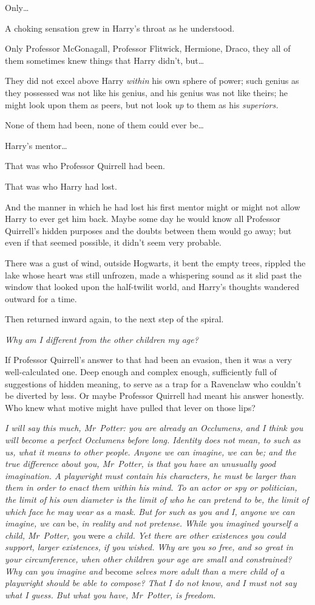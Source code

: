 Only…

A choking sensation grew in Harry's throat as he understood.

Only Professor McGonagall, Professor Flitwick, Hermione, Draco, they all of
them sometimes knew things that Harry didn't, but…

They did not excel above Harry \emph{within} his own sphere of power; such
genius as they possessed was not like his genius, and his genius was not like
theirs; he might look upon them as peers, but not look \emph{up} to them as his
\emph{superiors.}

None of them had been, none of them could ever be…

Harry's mentor…

That was who Professor Quirrell had been.

That was who Harry had lost.

And the manner in which he had lost his first mentor might or might not allow
Harry to ever get him back. Maybe some day he would know all Professor
Quirrell's hidden purposes and the doubts between them would go away; but even
if that seemed possible, it didn't seem very probable.

There was a gust of wind, outside Hogwarts, it bent the empty trees, rippled
the lake whose heart was still unfrozen, made a whispering sound as it slid
past the window that looked upon the half-twilit world, and Harry's thoughts
wandered outward for a time.

Then returned inward again, to the next step of the spiral.

\emph{Why am I different from the other children my age?}

If Professor Quirrell's answer to that had been an evasion, then it was a very
well-calculated one. Deep enough and complex enough, sufficiently full of
suggestions of hidden meaning, to serve as a trap for a Ravenclaw who couldn't
be diverted by less. Or maybe Professor Quirrell had meant his answer honestly.
Who knew what motive might have pulled that lever on those lips?

\emph{I will say this much, Mr~Potter: you are already an Occlumens, and I
think you will become a perfect Occlumens before long. Identity does not mean,
to such as us, what it means to other people. Anyone we can imagine, we can be;
and the true difference about you, Mr~Potter, is that you have an unusually
good imagination. A playwright must contain his characters, he must be larger
than them in order to enact them within his mind. To an actor or spy or
politician, the limit of his own diameter is the limit of who he can pretend to
be, the limit of which face he may wear as a mask. But for such as you and I,
anyone we can imagine, we can} be, \emph{in reality and not pretense. While you
imagined yourself a child, Mr~Potter, you} were \emph{a child. Yet there are
other existences you could support, larger existences, if you wished. Why are
you so free, and so great in your circumference, when other children your age
are small and constrained? Why can you imagine and} become \emph{selves more
adult than a mere child of a playwright should be able to compose? That I do
not know, and I must not say what I guess. But what you have, Mr~Potter, is
freedom.}

